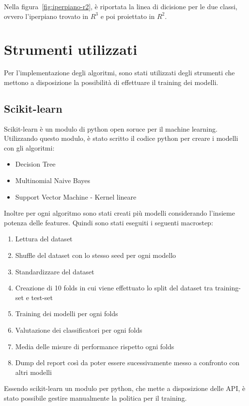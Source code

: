 \documentclass[oneside]{book}
\begin{document}
\noindent
Nella figura~\ref{fig:iperpiano-r2}, è riportata la linea di dicisione per le due classi, ovvero l'iperpiano trovato in $R^3$ e poi proiettato in $R^2$.

\section{Strumenti utilizzati}
Per l'implementazione degli algoritmi, sono stati utilizzati degli strumenti che mettono a disposizione la possibilità di effettuare il training dei modelli.

\subsection{Scikit-learn}
Scikit-learn\cite{scikit-learn} è un modulo di python open soruce per il machine learning. Utilizzando questo modulo, è stato scritto il codice python per creare i modelli con gli algoritmi:
\begin{itemize}
	\item Decision Tree
	\item Multinomial Naive Bayes
	\item Support Vector Machine - Kernel lineare
	
\end{itemize}
Inoltre per ogni algoritmo sono stati creati più modelli considerando l'insieme potenza delle features. Quindi sono stati eseguiti i seguenti macrostep:
\begin{enumerate}
	\item Lettura del dataset
	\item Shuffle del dataset con lo stesso seed per ogni modello
	\item Standardizzare del dataset
	\item Creazione di 10 folds in cui viene effettuato lo split del dataset tra training-set e test-set
	\item Training dei modelli per ogni folds
	\item Valutazione dei classificatori per ogni folds
	\item Media delle misure di performance rispetto ogni folds
	\item Dump del report così da poter essere sucessivamente messo a confronto con altri modelli
\end{enumerate}
Essendo scikit-learn un modulo per python, che mette a disposizione delle API, è stato possibile gestire manualmente la politica per il training.
\end{document}
